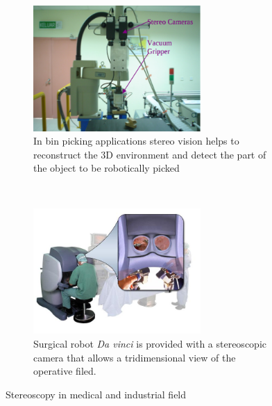 \begin{figure}[h!]
\centering
\begin{subfigure}[]{0.5\textwidth}
		\centering
        \includegraphics[width=0.7\textwidth]{./img/bin_pick.png}
                \caption{\scriptsize{In bin picking applications stereo vision helps to reconstruct the 3D environment and detect the part of the object to be robotically picked}}
\end{subfigure}%
~ \quad
\begin{subfigure}[]{0.5\textwidth}
	\centering
	\includegraphics[width=0.7\textwidth]{./img/da_vinci.jpg}
          \caption{\scriptsize{Surgical robot \textit{Da vinci} is provided with a stereoscopic camera that allows a tridimensional view of the operative filed.}}
\end{subfigure} 
\caption{\small{Stereoscopy in medical and industrial field}}
\end{figure}


